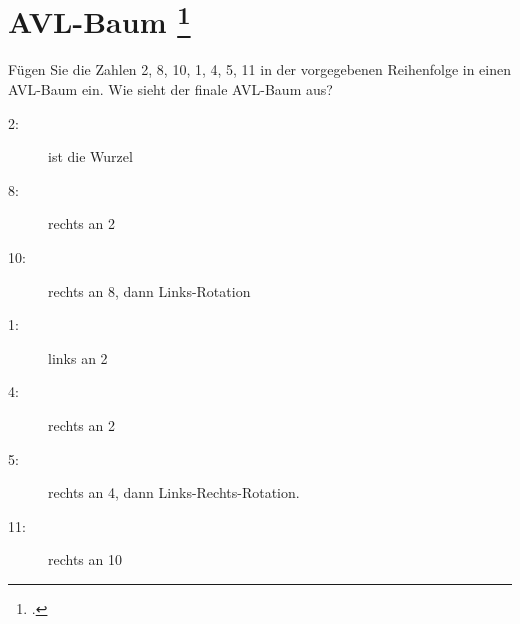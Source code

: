 \documentclass{lehramt-informatik-aufgabe}
\begin{document}

\section{AVL-Baum
\footcite{aud:e-klausur}}

Fügen Sie die Zahlen 2, 8, 10, 1, 4, 5, 11 in der vorgegebenen
Reihenfolge in einen AVL-Baum ein. Wie sieht der finale AVL-Baum aus?

\begin{antwort}
\begin{description}
\item[2:] ist die Wurzel
\item[8:] rechts an 2
\item[10:] rechts an 8, dann Links-Rotation
\item[1:] links an 2
\item[4:] rechts an 2
\item[5:] rechts an 4, dann Links-Rechts-Rotation.
\item[11:] rechts an 10
\end{description}

\end{antwort}
\end{document}
